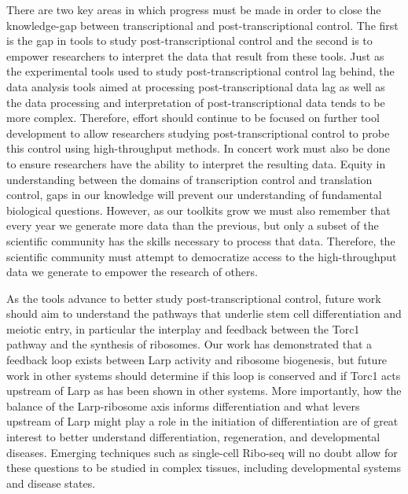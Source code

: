 \documentclass[12pt,oneside]{reedthesis}
\begin{document}
There are two key areas in which progress must be made in order to close the knowledge-gap between transcriptional and post-transcriptional control. The first is the gap in tools to study post-transcriptional control and the second is to empower researchers to interpret the data that result from these tools. Just as the experimental tools used to study post-transcriptional control lag behind, the data analysis tools aimed at processing post-transcriptional data lag as well as the data processing and interpretation of post-transcriptional data tends to be more complex. Therefore, effort should continue to be focused on further tool development to allow researchers studying post-transcriptional control to probe this control using high-throughput methods. In concert work must also be done to ensure researchers have the ability to interpret the resulting data. Equity in understanding between the domains of transcription control and translation control, gaps in our knowledge will prevent our understanding of fundamental biological questions. However, as our toolkits grow we must also remember that every year we generate more data than the previous, but only a subset of the scientific community has the skills necessary to process that data. Therefore, the scientific community must attempt to democratize access to the high-throughput data we generate to empower the research of others.

As the tools advance to better study post-transcriptional control, future work should aim to understand the pathways that underlie stem cell differentiation and meiotic entry, in particular the interplay and feedback between the Torc1 pathway and the synthesis of ribosomes. Our work has demonstrated that a feedback loop exists between Larp activity and ribosome biogenesis, but future work in other systems should determine if this loop is conserved and if Torc1 acts upstream of Larp as has been shown in other systems. More importantly, how the balance of the Larp-ribosome axis informs differentiation and what levers upstream of Larp might play a role in the initiation of differentiation are of great interest to better understand differentiation, regeneration, and developmental diseases. Emerging techniques such as single-cell Ribo-seq will no doubt allow for these questions to be studied in complex tissues, including developmental systems and disease states.
\end{document}
